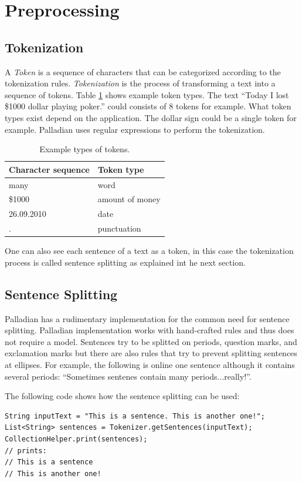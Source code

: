 \documentclass[a4paper,twoside]{book}      %
\begin{document}

\section{Preprocessing}
\subsection{Tokenization}
A \textit{Token} is a sequence of characters that can be categorized according to the tokenization rules. \textit{Tokenization} is the process of transforming a text into a sequence of tokens. Table \ref{tab:tokenTypes} shows example token types. The text ``Today I lost \$1000 dollar playing poker.'' could consists of 8 tokens for example. What token types exist depend on the application. The dollar sign could be a single token for example. Palladian uses regular expressions to perform the tokenization.

\begin{table}[ht!]
\centering
\begin{tabular}{|l|l|}
\hline
Character sequence		& Token type \\
\hline
many			& word \\
\hline
\$1000		& amount of money  \\
\hline
26.09.2010	& date \\
\hline
.				& punctuation \\
\hline
\end{tabular} 
\caption{Example types of tokens.}
\label{tab:tokenTypes}
\end{table}

One can also see each sentence of a text as a token, in this case the tokenization process is called sentence splitting as explained int he next section.

\subsection{Sentence Splitting}
Palladian has a rudimentary implementation for the common need for sentence splitting. Palladian implementation works with hand-crafted rules and thus does not require a model. Sentences try to be splitted on periods, question marks, and exclamation marks but there are also rules that try to prevent splitting sentences at ellipses. For example, the following is online one sentence although it contains several periods: ``Sometimes sentenes contain many periods...really!''.

The following code shows how the sentence splitting can be used:
\begin{codelisting}
\begin{lstlisting}[caption=Using the sentence splitter.,frame=tb]
String inputText = "This is a sentence. This is another one!";
List<String> sentences = Tokenizer.getSentences(inputText);
CollectionHelper.print(sentences);
// prints:
// This is a sentence
// This is another one!
\end{lstlisting}
\end{codelisting}
\end{document}
